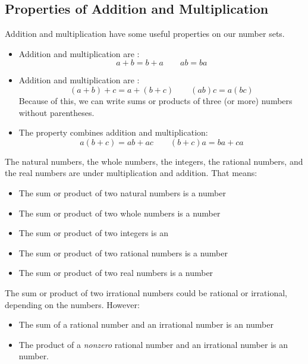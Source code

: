 \subsection{Properties of Addition and Multiplication} 
Addition and multiplication have some useful properties on our number sets.
\begin{displaybox}
\begin{itemize}
For any three real numbers $a$, $b$, and $c$, we have the following properties.
\item Addition and multiplication are \makeblank[1.5in]:
\[
a+b=b+a
\qquad
ab=ba
\]
\item Addition and multiplication are \makeblank[1.5in]:
\[
(a+b)+c=a+(b+c)
\qquad
(ab)c=a(bc)
\]
Because of this, we can write sums or products of three (or more) numbers without parentheses.
\item The \makeblank[1.5in] property combines addition and multiplication:
\[
a(b+c)=ab+ac
\qquad
(b+c)a=ba+ca
\]
\end{itemize}
\end{displaybox}
\begin{displaybox}[Closure]
The natural numbers, the whole numbers, the integers, the rational numbers, and the real numbers are  under multiplication and addition. That means:
\begin{itemize}
\item The sum or product of two natural numbers is a \makeblank[1in] number
\item The sum or product of two whole numbers is a \makeblank[1in] number
\item The sum or product of two integers is an \makeblank[1in]
\item The sum or product of two rational numbers is a \makeblank[1in] number
\item The sum or product of two real numbers is a \makeblank[1in] number
\end{itemize}
The sum or product of two irrational numbers could be rational or irrational, depending on the numbers. However:
\begin{itemize}
\item The sum of a rational number and an irrational number is an \makeblank[1in] number
\item The product of a \emph{nonzero} rational number and an irrational number is an \makeblank[1in] number.
\end{itemize}
\end{displaybox}